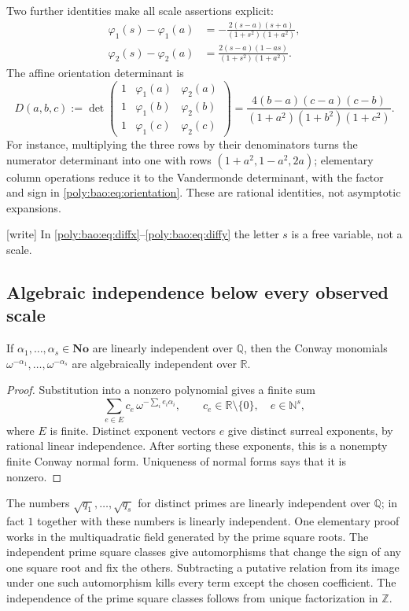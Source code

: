 \documentclass[11pt,a4paper]{article}
\numberwithin{equation}{section}
\theoremstyle{plain}
\newcommand{\wtag}{\textup{[write]}}%
\newcommand{\No}{\mathbf{No}}
\newcommand{\R}{\mathbb R}
\newcommand{\Q}{\mathbb Q}
\newcommand{\Z}{\mathbb Z}
\newcommand{\N}{\mathbb N}
\newcommand{\ph}{\varphi}
\begin{document}
Two further identities make all scale assertions explicit:
\begin{align}
 \ph_1(s)-\ph_1(a)
 &=-\frac{2(s-a)(s+a)}{(1+s^2)(1+a^2)},\label{poly:bao:eq:diffx}\\
 \ph_2(s)-\ph_2(a)
 &=\frac{2(s-a)(1-as)}{(1+s^2)(1+a^2)}.\label{poly:bao:eq:diffy}
\end{align}
The affine orientation determinant is
\begin{equation}\label{poly:bao:eq:orientation}
 D(a,b,c):=
 \det\begin{pmatrix}
 1&\ph_1(a)&\ph_2(a)\\
 1&\ph_1(b)&\ph_2(b)\\
 1&\ph_1(c)&\ph_2(c)
 \end{pmatrix}
 =\frac{4(b-a)(c-a)(c-b)}{(1+a^2)(1+b^2)(1+c^2)}.
\end{equation}
For instance, multiplying the three rows by their denominators turns the
numerator determinant into one with rows $(1+a^2,1-a^2,2a)$; elementary
column operations reduce it to the Vandermonde determinant, with the
factor and sign in \eqref{poly:bao:eq:orientation}. These are rational identities,
not asymptotic expansions.

\wtag{} In \eqref{poly:bao:eq:diffx}--\eqref{poly:bao:eq:diffy} the letter
$s$ is a free variable, not a scale.

\subsection{Algebraic independence below every observed scale}
\begin{lemma}\label{poly:bao:lem:monomial}
If $\alpha_1,\ldots,\alpha_s\in\No$ are linearly independent over $\Q$,
then the Conway monomials $\omega^{-\alpha_1},\ldots,
\omega^{-\alpha_s}$ are algebraically independent over $\R$.
\end{lemma}
\begin{proof}
Substitution into a nonzero polynomial gives a finite sum
\[
 \sum_{e\in E}c_e\,\omega^{-\sum_i e_i\alpha_i},
 \qquad c_e\in\R\setminus\{0\},\quad e\in\N^s,
\]
where $E$ is finite. Distinct exponent vectors $e$ give distinct surreal
exponents, by rational linear independence. After sorting these exponents,
this is a nonempty finite Conway normal form. Uniqueness of normal forms
\cite{bao:vDE} says that it is nonzero.
\end{proof}

The numbers $\sqrt{q_1},\ldots,\sqrt{q_s}$ for distinct primes are
linearly independent over $\Q$; in fact $1$ together with these numbers
is linearly independent. One elementary proof works in the multiquadratic
field generated by the prime square roots. The independent prime square
classes give automorphisms that change the sign of any one square root
and fix the others. Subtracting a putative relation from its image under
one such automorphism kills every term except the chosen coefficient.
The independence of the prime square classes follows from unique
factorization in $\Z$.
\end{document}
